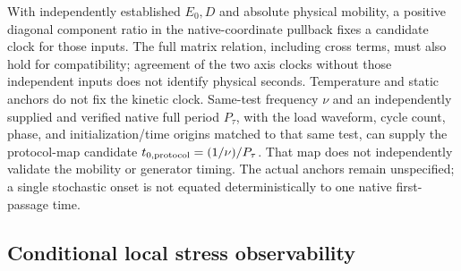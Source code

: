 \documentclass[11pt]{article}
\begin{document}
With independently established $E_0,D$ and absolute physical mobility,
a positive diagonal component ratio in the native-coordinate pullback
fixes a candidate clock for those inputs.
The full matrix relation, including cross terms, must also hold for compatibility;
agreement of the two axis clocks without those independent inputs
does not identify physical seconds.
Temperature and static anchors do not fix the kinetic clock.
Same-test frequency $\nu$ and an independently supplied and verified native
full period $P_\tau$, with the load waveform, cycle count, phase, and
initialization/time origins matched to that same test, can supply the
protocol-map candidate $t_{0,\rm protocol}=(1/\nu)/P_\tau$.
That map does not independently validate the mobility or generator timing.
The actual anchors remain unspecified; a single stochastic onset is
not equated deterministically to one native first-passage time.

\subsection{Conditional local stress observability}
\end{document}
